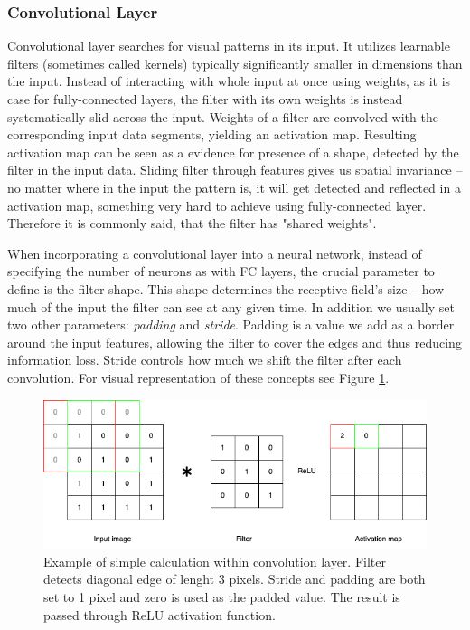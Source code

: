 \subsubsection{Convolutional Layer}

Convolutional layer searches for visual patterns in its input. It utilizes learnable filters (sometimes called kernels) typically significantly smaller in dimensions than the input. Instead of interacting with whole input at once using weights, as it is case for fully-connected layers, the filter with its own weights is instead systematically slid across the input. Weights of a filter are convolved with the corresponding input data segments, yielding an activation map. Resulting activation map can be seen as a evidence for presence of a shape, detected by the filter in the input data. Sliding filter through features gives us spatial invariance -- no matter where in the input the pattern is, it will get detected and reflected in a activation map, something very hard to achieve using fully-connected layer. Therefore it is commonly said, that the filter has "shared weights".

When incorporating a convolutional layer into a neural network, instead of specifying the number of neurons as with FC layers, the crucial parameter to define is the filter shape. This shape determines the receptive field's size -- how much of the input the filter can see at any given time. In addition we usually set two other parameters: \emph{padding} and \emph{stride}. Padding is a value we add as a border around the input features, allowing the filter to cover the edges and thus reducing information loss. Stride controls how much we shift the filter after each convolution. For visual representation of these concepts see Figure \ref{fig:cnn-convolution}.


\begin{figure}[!h]
    \begin{center}
    \begin{minipage}{0.75\textwidth}
      \includegraphics[width=\textwidth]{img/cnn-conv.png}
    \end{minipage}
    \caption{Example of simple calculation within convolution layer. Filter detects diagonal edge of lenght 3 pixels. Stride and padding are both set to 1 pixel and zero is used as the padded value. The result is passed through ReLU activation function.}
    \label{fig:cnn-convolution}
    \end{center}
\end{figure}

